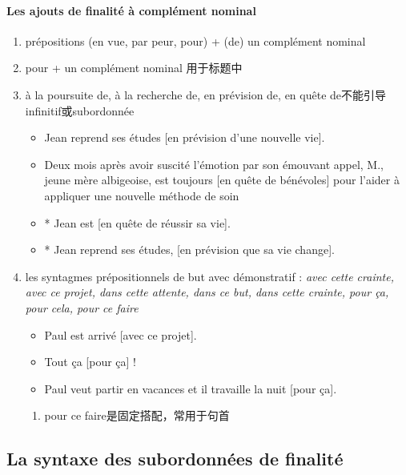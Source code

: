 \documentclass[UTF8]{report}
\begin{document}
\paragraph{Les ajouts de finalité à complément nominal}
\begin{enumerate}
    \item prépositions (en vue, par peur, pour) + (de) un complément nominal
    \item pour + un complément nominal 用于标题中
    \item à la poursuite de, à la recherche de, en prévision de, en quête de不能引导infinitif或subordonnée
    \begin{itemize}
        \item Jean reprend ses études [en prévision d’une nouvelle vie].
        \item Deux mois après avoir suscité l’émotion par son émouvant appel, M., jeune mère albigeoise, est toujours [en quête de bénévoles] pour l’aider à appliquer une nouvelle méthode de soin
        \item * Jean est [en quête de réussir sa vie].
        \item * Jean reprend ses études, [en prévision que sa vie change].
    \end{itemize}
    \item les syntagmes prépositionnels de but avec démonstratif : \textit{avec cette crainte, avec ce projet, dans cette attente, dans ce but, dans cette crainte, pour ça, pour cela, pour ce faire}
    \begin{itemize}
        \item Paul est arrivé [avec ce projet].
        \item Tout ça [pour ça] !
        \item Paul veut partir en vacances et il travaille la nuit [pour ça].
    \end{itemize}
    \begin{enumerate}
        \item pour ce faire是固定搭配，常用于句首
    \end{enumerate}
\end{enumerate}

\subsection{La syntaxe des subordonnées de finalité}
\end{document}
